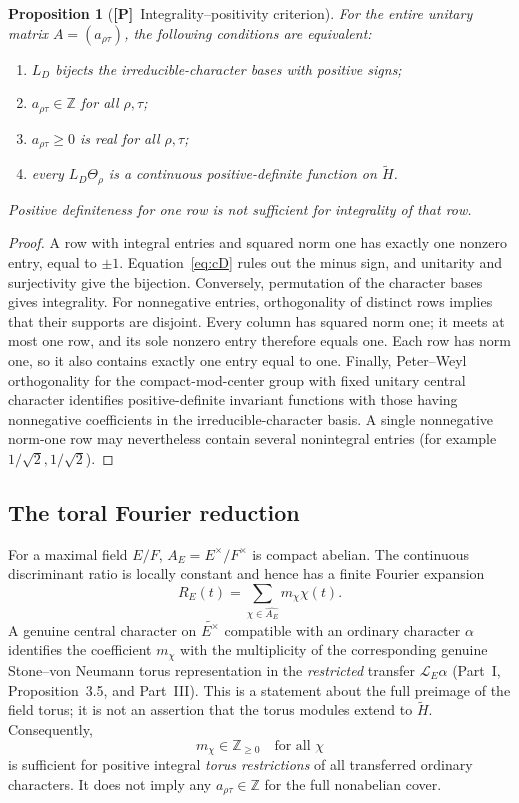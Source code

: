 \documentclass[11pt]{article}
\newcommand{\tH}{\widetilde H}
\newcommand{\Ptag}{\textnormal{\textbf{[P]}}}
\theoremstyle{plain}
\newtheorem{proposition}[theorem]{Proposition}
\theoremstyle{definition}
\begin{document}
\begin{proposition}[\Ptag\ Integrality--positivity criterion]\label{prop:int}
For the entire unitary matrix $A=(a_{\rho\tau})$, the following
conditions are equivalent:
\begin{enumerate}[label=(\roman*)]
\item $L_D$ bijects the irreducible-character bases with positive signs;
\item $a_{\rho\tau}\in\mathbb Z$ for all $\rho,\tau$;
\item $a_{\rho\tau}\ge0$ is real for all $\rho,\tau$;
\item every $L_D\Theta_\rho$ is a continuous positive-definite
function on $\tH$.
\end{enumerate}
Positive definiteness for \emph{one} row is not sufficient for
integrality of that row.
\end{proposition}
\begin{proof}
A row with integral entries and squared norm one has exactly one
nonzero entry, equal to $\pm1$.  Equation~\eqref{eq:cD} rules out the
minus sign, and unitarity and surjectivity give the bijection.
Conversely, permutation of the character bases gives integrality.
For nonnegative entries, orthogonality of distinct rows implies
that their supports are disjoint.  Every column has squared norm
one; it meets at most one row, and its sole nonzero entry therefore
equals one.  Each row has norm one, so it also contains exactly one
entry equal to one.  Finally, Peter--Weyl orthogonality for the
compact-mod-center group with fixed unitary central character
identifies positive-definite invariant functions with those having
nonnegative coefficients in the irreducible-character basis.
A single nonnegative norm-one row may nevertheless contain several
nonintegral entries (for example $1/\sqrt2,1/\sqrt2$).
\end{proof}

\subsection{The toral Fourier reduction}
For a maximal field $E/F$, $A_E=E^\times/F^\times$ is compact
abelian.  The continuous discriminant ratio is locally constant and
hence has a finite Fourier expansion
\begin{equation}\label{eq:R-Fourier}
R_E(t)=\sum_{\chi\in\widehat{A_E}}m_\chi\chi(t).
\end{equation}
A genuine central character on $\widetilde{E^\times}$ compatible
with an ordinary character $\alpha$ identifies the coefficient
$m_\chi$ with the multiplicity of the corresponding genuine
Stone--von Neumann torus representation in the \emph{restricted}
transfer $\mathcal L_E\alpha$ (Part~I, Proposition~3.5,
and Part~III).  This is a statement about the full preimage
of the field torus; it is not an assertion that the torus modules
extend to $\tH$.  Consequently,
\begin{equation}\label{eq:toralnecessary}
 m_\chi\in\mathbb Z_{\ge0}\quad\text{for all $\chi$}
\end{equation}
is sufficient for positive integral \emph{torus restrictions} of
all transferred ordinary characters.  It does not imply any
$a_{\rho\tau}\in\mathbb Z$ for the full nonabelian cover.
\end{document}
